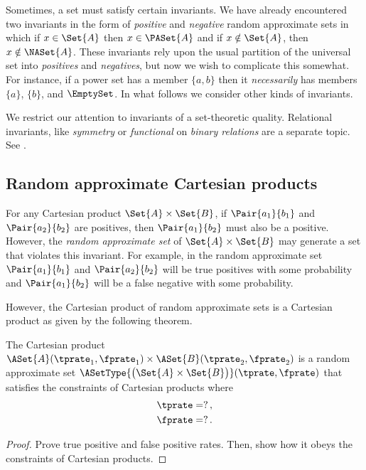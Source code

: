 \documentclass[ ../main.tex]{subfiles}
\begin{document}
Sometimes, a set must satisfy certain invariants.
We have already encountered two invariants in the form of \emph{positive} and \emph{negative} random approximate sets in which if $x \in \Set{A}$ then $x \in \PASet{A}$ and if $x \notin \Set{A}$, then $x \notin \NASet{A}$.
These invariants rely upon the usual partition of the universal set into \emph{positives} and \emph{negatives}, but now we wish to complicate this somewhat.
For instance, if a power set has a member $\{a,b\}$ then it \emph{necessarily} has members $\{a\}$, $\{b\}$, and $\EmptySet$.
In what follows we consider other kinds of invariants.

We restrict our attention to invariants of a set-theoretic quality.
Relational invariants, like \emph{symmetry} or \emph{functional} on \emph{binary relations} are a separate topic. See \cite{approxrel}.

\subsection{Random approximate Cartesian products}
For any Cartesian product $\Set{A} \times \Set{B}$, if $\Pair{a_1}{b_1}$ and $\Pair{a_2}{b_2}$ are positives, then $\Pair{a_1}{b_2}$ must also be a positive.
However, the \emph{random approximate set} of $\Set{A} \times \Set{B}$ may generate a set that violates this invariant.
For example, in the random approximate set $\Pair{a_1}{b_1}$ and $\Pair{a_2}{b_2}$ will be true positives with some probability and $\Pair{a_1}{b_2}$ will be a false negative with some probability.

However, the Cartesian product of random approximate sets is a Cartesian product as given by the following theorem.
\begin{theorem}
	The Cartesian product $\ASet{A}(\tprate_1,\fprate_1) \times \ASet{B}(\tprate_2,\fprate_2)$ is a random approximate set $\ASetType{\left(\Set{A} \times \Set{B}\right)}(\tprate,\fprate)$ that satisfies the constraints of Cartesian products where
	\begin{equation}
	\begin{split}
	\tprate &= ?\,,\\
	\fprate &= ?\,.
	\end{split}
	\end{equation}
\end{theorem}
\begin{proof}
	Prove true positive and false positive rates.
	Then, show how it obeys the constraints of Cartesian products.
\end{proof}
\end{document}
